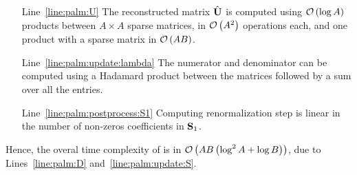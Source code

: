 \begin{itemize}
 \item [Line~\ref{line:palm:U}] The reconstructed matrix $\hat {{\mathbf{U}}}$ is computed using $\mathcal{O}\left (\log A\right )$ products between $A\times A$ sparse matrices, in $\mathcal{O}\left (A^2\right )$ operations each, and one product with a sparse matrix in $\mathcal{O}\left (AB\right )$.
 \item [Line~\ref{line:palm:update:lambda}] The numerator and denominator can be computed using a Hadamard product between the matrices followed by a sum over all the entries.
  \item [Line~\ref{line:palm:postprocess:S1}] Computing renormalization step is linear in the number of non-zeros coefficients in ${\mathbf{S}}_1$.
\end{itemize}

Hence, the overal time complexity of \palm is in $\mathcal{O}\left (AB\left (\log^2 A+\log B\right )\right )$, due to Lines~\ref{line:palm:D} and~\ref{line:palm:update:S}.

